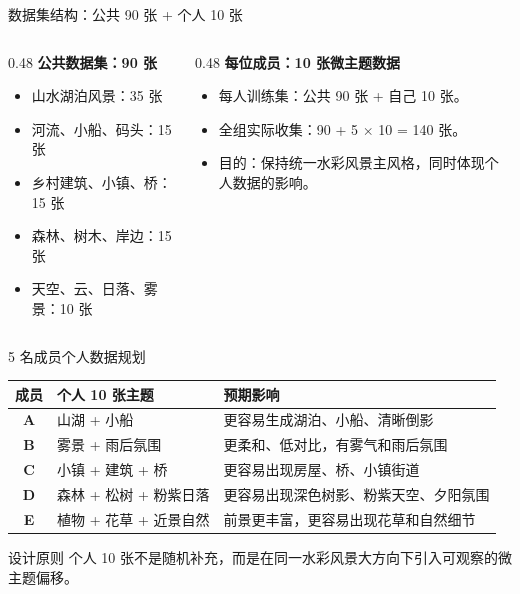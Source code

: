 \documentclass[aspectratio=169,11pt]{ctexbeamer}
\begin{document}
\begin{frame}{数据集结构：公共 90 张 + 个人 10 张}
  \begin{columns}[T,onlytextwidth]
    \begin{column}{0.48\textwidth}
      \textbf{公共数据集：90 张}
      \begin{itemize}
        \item 山水湖泊风景：35 张
        \item 河流、小船、码头：15 张
        \item 乡村建筑、小镇、桥：15 张
        \item 森林、树木、岸边：15 张
        \item 天空、云、日落、雾景：10 张
      \end{itemize}
    \end{column}
    \begin{column}{0.48\textwidth}
      \textbf{每位成员：10 张微主题数据}
      \begin{itemize}
        \item 每人训练集：公共 90 张 + 自己 10 张。
        \item 全组实际收集：90 + 5 $\times$ 10 = 140 张。
        \item 目的：保持统一水彩风景主风格，同时体现个人数据的影响。
      \end{itemize}
    \end{column}
  \end{columns}
\end{frame}

\begin{frame}{5 名成员个人数据规划}
  \small
  \begin{tabularx}{\textwidth}{>{\bfseries}c X X}
    \toprule
    成员 & 个人 10 张主题 & 预期影响 \\
    \midrule
    A & 山湖 + 小船 & 更容易生成湖泊、小船、清晰倒影 \\
    B & 雾景 + 雨后氛围 & 更柔和、低对比，有雾气和雨后氛围 \\
    C & 小镇 + 建筑 + 桥 & 更容易出现房屋、桥、小镇街道 \\
    D & 森林 + 松树 + 粉紫日落 & 更容易出现深色树影、粉紫天空、夕阳氛围 \\
    E & 植物 + 花草 + 近景自然 & 前景更丰富，更容易出现花草和自然细节 \\
    \bottomrule
  \end{tabularx}

  \vspace{0.8em}
  \begin{block}{设计原则}
    个人 10 张不是随机补充，而是在同一水彩风景大方向下引入可观察的微主题偏移。
  \end{block}
\end{frame}
\end{document}
